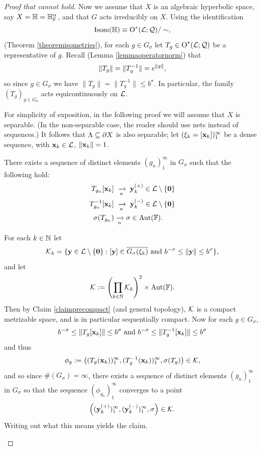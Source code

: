 \begin{proof}[Proof that  cannot hold]
Now we assume that $X$ is an algebraic hyperbolic space, say $X = \H = \H_\F^\alpha$, and that $G$ acts irreducibly on $X$. Using the identification
\[
\Isom(\H) \equiv \O^*(\LL;\QQ)/\sim,
\]
(Theorem \ref{theoremisometries}), for each $g\in G_\sigma$ let $T_g\in\operatorname{O}^*(\mathcal L;\mathcal Q)$ be a representative of $g$. Recall (Lemma \ref{lemmaoperatornorm}) that
\[
\|T_g\| = \|T_g^{-1}\| = e^{\|g\|},
\]
so since $g\in G_\sigma$ we have $\|T_g\| = \|T_g^{-1}\| \leq b^\sigma$. In particular, the family $(T_g)_{g\in G_\sigma}$ acts equicontinuously on $\mathcal L$.

For simplicity of exposition, in the following proof we will assume that $X$ is separable. (In the non-separable case, the reader should use nets instead of sequences.) It follows that $\Lambda\subseteq\partial X$ is also separable; let $(\xi_k = [\mathbf x_k])_1^\infty$ be a dense sequence, with $\mathbf x_k\in\mathcal L$, $\|\mathbf x_k\| = 1$.

\begin{claim}
There exists a sequence of distinct elements $(g_n)_1^\infty$ in $G_\sigma$ such that the following hold:
\begin{align*}
T_{g_n}[\xx_k] &\;\tendsto n\; \yy_k^{(+)}\in\LL\butnot\{\0\} \\
T_{g_n}^{-1}[\xx_k] &\;\tendsto n\; \yy_k^{(-)}\in\LL\butnot\{\0\}\\
\sigma(T_{g_n}) &\tendsto n \sigma\in\Aut(\F).
\end{align*} 
\end{claim}
\begin{subproof}
For each $k\in\N$ let
\[
\mathcal K_k = \{\mathbf y\in\mathcal L\setminus\{\mathbf 0\}: [\mathbf y]\in \overline{G_\sigma(\xi_k)} \textup{ and } b^{-\sigma} \leq \|\mathbf y\| \leq b^\sigma\},
\]
and let
\[
\KK := \left(\prod_{k\in\N}\KK_k\right)^2 \times \Aut(\F).
\]
Then by Claim \ref{claimprecompact} (and general topology), $\mathcal K$ is a compact metrizable space, and is in particular sequentially compact. Now for each $g\in G_\sigma$,
\[
b^{-\sigma} \leq \|T_g[\mathbf x_k]\| \leq b^\sigma \textup{ and } b^{-\sigma} \leq \|T_g^{-1}[\mathbf x_k]\| \leq b^\sigma 
\]
and thus
\[
\phi_g := \left((T_g(\mathbf x_k))_1^\infty, (T_g^{-1}(\mathbf x_k))_1^\infty, \sigma(T_g)\right)\in\mathcal K,
\]
and so since $\#(G_\sigma) = \infty$, there exists a sequence of distinct elements $(g_n)_1^\infty$ in $G_\sigma$ so that the sequence $(\phi_{g_n})_1^\infty$ converges to a point
\[
\left((\mathbf y_k^{(+)})_1^\infty, (\mathbf y_k^{(-)})_1^\infty, \sigma\right)\in\mathcal K.
\]
Writing out what this means yields the claim.
\end{subproof}


\end{proof}
